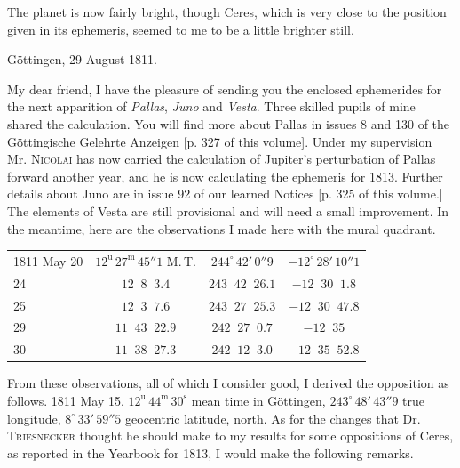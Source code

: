 \par\indent The planet is now fairly bright, though Ceres, which is very close to the position given in its ephemeris, seemed to me to be a little brighter still.
\begin{flushright}Göttingen, 29 August 1811.\end{flushright}
\par\indent My dear friend, I have the pleasure of sending you the enclosed ephemerides for the next apparition of \emph{Pallas}, \emph{Juno} and \emph{Vesta}. Three skilled pupils of mine shared the calculation. You will find more about Pallas in issues 8 and 130 of the Göttingische Gelehrte Anzeigen [p. 327 of this volume]. Under my supervision Mr. \textsc{Nicolai} has now carried the calculation of Jupiter’s perturbation of Pallas forward another year, and he is now calculating the ephemeris for 1813. Further details about Juno are in issue 92 of our learned Notices [p. 325 of this volume.] The elements of Vesta are still provisional and will need a small improvement. In the meantime, here are the observations I made here with the mural quadrant.
\begin{center}\fontsize{10}{12}\selectfont\setlength{\tabcolsep}{4pt}\renewcommand{\arraystretch}{1.15}
\begin{tabular}{l|c|c|c}
1811 May 20 & $12^{\mathrm u}\,27^{\mathrm m}\,45''1$ M.\,T. & $244^\circ\,42'\,0''9$ & $-12^\circ\,28'\,10''1$ \\
\phantom{1811 May }24 & $12\;\;8\;\;3.4$ & $243\;\;42\;\;26.1$ & $-12\;\;30\;\;1.8$ \\
\phantom{1811 May }25 & $12\;\;3\;\;7.6$ & $243\;\;27\;\;25.3$ & $-12\;\;30\;\;47.8$ \\
\phantom{1811 May }29 & $11\;\;43\;\;22.9$ & $242\;\;27\;\;0.7$ & $-12\;\;35$ \\
\phantom{1811 May }30 & $11\;\;38\;\;27.3$ & $242\;\;12\;\;3.0$ & $-12\;\;35\;\;52.8$ \\
\end{tabular}
\end{center}


\par\indent From these observations, all of which I consider good, I derived the opposition as follows. 1811 May 15. $12^{\mathrm u}\,44^{\mathrm m}\,30^{\mathrm s}$ mean time in Göttingen, $243^\circ\,48'\,43''9$ true longitude, $8^\circ\,33'\,59''5$ geocentric latitude, north. As for the changes that Dr. \textsc{Triesnecker} thought he should make to my results for some oppositions of Ceres, as reported in the Yearbook for 1813, I would make the following remarks.

